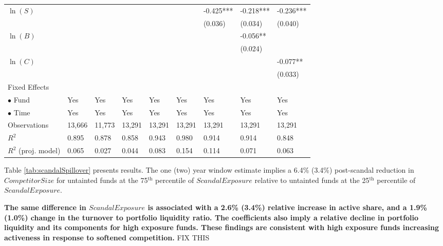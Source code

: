 \documentclass[openany]{book}
\theoremstyle{definition}
\theoremstyle{definition}
\theoremstyle{definition}
\theoremstyle{remark}
\begin{document}
\begin{table}[ht]
\begin{tabularx}{0.975\textwidth}{lYYYYYYYY}
  $\ln(S)$ &  &  &  &  &  & -0.425*** & -0.218*** & -0.236*** \\ 
   &  &  &  &  &  & (0.036) & (0.034) & (0.040) \\ 
  $\ln(B)$ &  &  &  &  &  &  & -0.056** &  \\ 
   &  &  &  &  &  &  & (0.024) &  \\ 
  $\ln(C)$ &  &  &  &  &  &  &  & -0.077** \\ 
   &  &  &  &  &  &  &  & (0.033) \\ 
  Fixed Effects &  &  &  &  &  &  &  &  \\ 
  $\bullet$ Fund & Yes & Yes & Yes & Yes & Yes & Yes & Yes & Yes \\ 
  $\bullet$ Time & Yes & Yes & Yes & Yes & Yes & Yes & Yes & Yes \\ 
  Observations & 13,666 & 11,773 & 13,291 & 13,291 & 13,291 & 13,291 & 13,291 & 13,291 \\ 
  $R^2$ & 0.895 & 0.878 & 0.858 & 0.943 & 0.980 & 0.914 & 0.914 & 0.848 \\ 
  $R^2$ (proj. model) & 0.065 & 0.027 & 0.044 & 0.083 & 0.154 & 0.114 & 0.071 & 0.063 \\ 
   \bottomrule
\end{tabularx}
\endgroup
\end{table}

Table \ref{tab:scandalSpillover} presents results. The one (two) year
window estimate implies a 6.4\% (3.4\%) post-scandal reduction in
\(CompetitorSize\) for untainted funds at the 75\(^{\text{th}}\)
percentile of \(ScandalExposure\) relative to untainted funds at the
25\(^{\text{th}}\) percentile of \(ScandalExposure\).

\textbf{The same difference in \(ScandalExposure\) is associated with a
2.6\% (3.4\%) relative increase in active share, and a 1.9\% (1.0\%)
change in the turnover to portfolio liquidity ratio. The coefficients
also imply a relative decline in portfolio liquidity and its components
for high exposure funds. These findings are consistent with high
exposure funds increasing activeness in response to softened
competition.} FIX THIS
\end{document}
